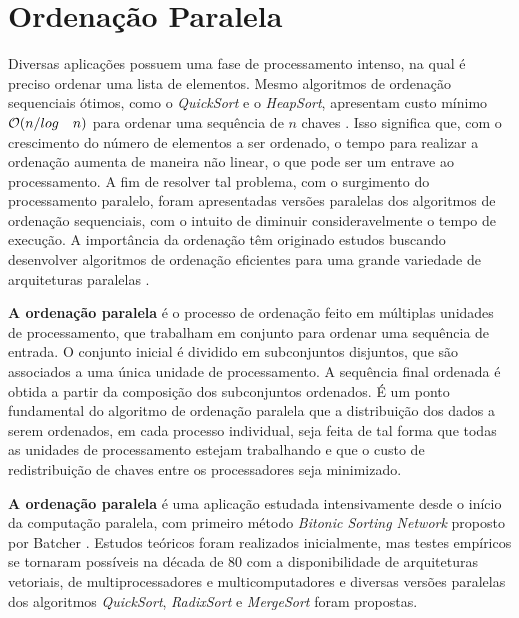 \section{Ordenação Paralela}


Diversas aplicações possuem uma fase de processamento intenso, na qual é preciso ordenar uma lista de elementos. Mesmo algoritmos de ordenação sequenciais ótimos, como o \textit{QuickSort} e o \textit{HeapSort}, apresentam custo mínimo ${\cal O}(n/log \quad n)$ para ordenar uma sequência de $n$ chaves \cite{Cormen:2009}. 
Isso significa que, com o crescimento do número de elementos a ser ordenado, o tempo para realizar a ordenação aumenta de maneira não linear, o que pode ser um entrave ao processamento. 
A fim de resolver tal problema, com o surgimento do processamento paralelo, foram apresentadas versões paralelas dos algoritmos de ordenação sequenciais, com o intuito de diminuir consideravelmente o tempo de execução. A importância da ordenação têm originado estudos buscando desenvolver algoritmos de ordenação eficientes para uma grande variedade de arquiteturas paralelas \cite{Akl:1990}.

\textbf{A ordenação paralela} é o processo  de ordenação feito em múltiplas unidades de processamento, que trabalham em conjunto para ordenar uma sequência de entrada. O conjunto inicial é dividido em subconjuntos disjuntos, que são associados a uma única unidade de processamento. A sequência final ordenada é obtida a partir da composição dos subconjuntos ordenados. É um ponto fundamental do algoritmo de ordenação paralela que a distribuição dos dados a serem ordenados, em cada processo individual, seja feita de tal forma que todas as unidades de processamento estejam trabalhando e que o custo de redistribuição de chaves entre os processadores seja minimizado. 

\textbf{A ordenação paralela} é uma aplicação estudada intensivamente desde o início da computação paralela, com primeiro método \textit{Bitonic Sorting Network} proposto por Batcher \cite{Batcher:1968}. 
Estudos teóricos foram realizados inicialmente, mas testes empíricos se tornaram possíveis na década de 80 com a disponibilidade de arquiteturas vetoriais, de multiprocessadores e multicomputadores e diversas versões paralelas dos algoritmos \textit{QuickSort}, \textit{RadixSort} e \textit{MergeSort} foram propostas. 

